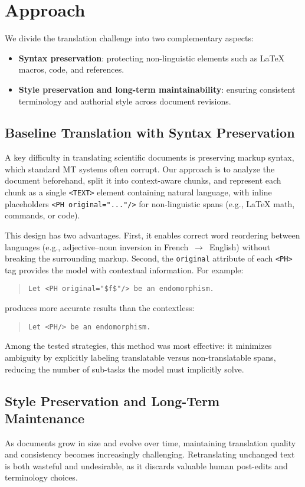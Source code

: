 \documentclass[runningheads]{llncs}
\begin{document}
\section{Approach}\label{sec:approach}
We divide the translation challenge into two complementary aspects:
\begin{itemize}
    \item \textbf{Syntax preservation}: protecting non-linguistic elements such
        as LaTeX macros, code, and references. 
    \item \textbf{Style preservation and long-term maintainability}: ensuring
        consistent terminology and authorial style across document revisions.
\end{itemize}

\subsection{Baseline Translation with Syntax Preservation}
A key difficulty in translating scientific documents is preserving markup
syntax, which standard MT systems often corrupt. Our approach is to analyze the
document beforehand, split it into context-aware chunks, and represent each
chunk as a single \texttt{<TEXT>} element containing natural language, with
inline placeholders \texttt{<PH original="..."/>} for non-linguistic spans
(e.g., LaTeX math, commands, or code).

This design has two advantages. First, it enables correct word reordering
between languages (e.g., adjective–noun inversion in French~$\rightarrow$~English)
without breaking the surrounding markup. Second, the \texttt{original}
attribute of each \texttt{<PH>} tag provides the model with contextual
information. For example:

\begin{quote}
\texttt{Let <PH original="\$f\$"/> be an endomorphism.}
\end{quote}

produces more accurate results than the contextless:
\begin{quote}
\texttt{Let <PH/> be an endomorphism.}
\end{quote}

Among the tested strategies, this method was most effective: it minimizes
ambiguity by explicitly labeling translatable versus non-translatable spans,
reducing the number of sub-tasks the model must implicitly solve.

\subsection{Style Preservation and Long-Term Maintenance}
As documents grow in size and evolve over time, maintaining translation quality
and consistency becomes increasingly challenging. Retranslating unchanged text
is both wasteful and undesirable, as it discards valuable human post-edits and
terminology choices.
\end{document}
